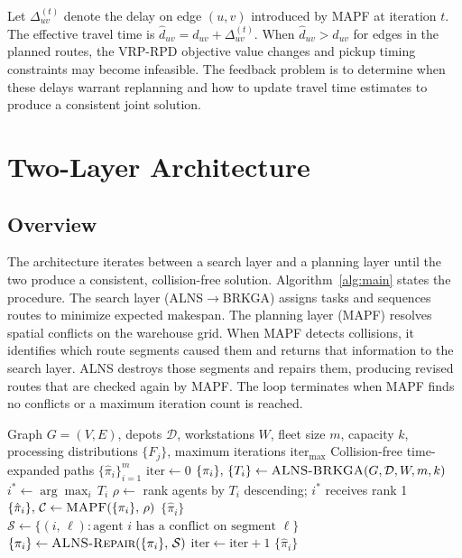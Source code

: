 \documentclass{article}
\begin{document}
Let $\Delta_{uv}^{(t)}$ denote the delay on edge $(u,v)$ introduced by MAPF
at iteration $t$. The effective travel time is $\hat{d}_{uv} = d_{uv} +
\Delta_{uv}^{(t)}$. When $\hat{d}_{uv} > d_{uv}$ for edges in the planned
routes, the VRP-RPD objective value changes and pickup timing constraints may
become infeasible. The feedback problem is to determine when these delays
warrant replanning and how to update travel time estimates to produce a
consistent joint solution.

\section{Two-Layer Architecture}
\label{sec:method}

\subsection{Overview}

The architecture iterates between a search layer and a planning layer until the
two produce a consistent, collision-free solution. Algorithm~\ref{alg:main}
states the procedure. The search layer (ALNS$\to$BRKGA) assigns tasks and
sequences routes to minimize expected makespan. The planning layer (MAPF)
resolves spatial conflicts on the warehouse grid. When MAPF detects collisions,
it identifies which route segments caused them and returns that information to
the search layer. ALNS destroys those segments and repairs them, producing
revised routes that are checked again by MAPF. The loop terminates when MAPF
finds no conflicts or a maximum iteration count is reached.

\begin{algorithm}[H]
\caption{VRP-RPD/MAPF with Critical-Path Priority}
\label{alg:main}
\begin{algorithmic}[1]
\Require Graph $G=(V,E)$, depots $\mathcal{D}$, workstations $W$,
         fleet size $m$, capacity $k$, processing distributions $\{F_j\}$,
         maximum iterations $\text{iter}_{\max}$
\Ensure Collision-free time-expanded paths $\{\hat{\pi}_i\}_{i=1}^{m}$
\State $\text{iter} \leftarrow 0$
\Repeat
    \State $\{\pi_i\},\, \{T_i\} \leftarrow \textsc{ALNS-BRKGA}(G, \mathcal{D}, W, m, k)$
    \State $i^* \leftarrow \arg\max_i\, T_i$ 
    \State $\rho \leftarrow$ rank agents by $T_i$ descending; $i^*$ receives rank 1
    \State $\{\hat{\pi}_i\},\, \mathcal{C} \leftarrow \textsc{MAPF}(\{\pi_i\},\, \rho)$
        \State \Return $\{\hat{\pi}_i\}$
    \EndIf
    \State $\mathcal{S} \leftarrow \{(i,\,\ell) : \text{agent } i
           \text{ has a conflict on segment } \ell\}$
    \State $\{\pi_i\} \leftarrow \textsc{ALNS-Repair}(\{\pi_i\},\, \mathcal{S})$
    \State $\text{iter} \leftarrow \text{iter} + 1$
\State \Return $\{\hat{\pi}_i\}$
\end{algorithmic}
\end{algorithm}
\end{document}

